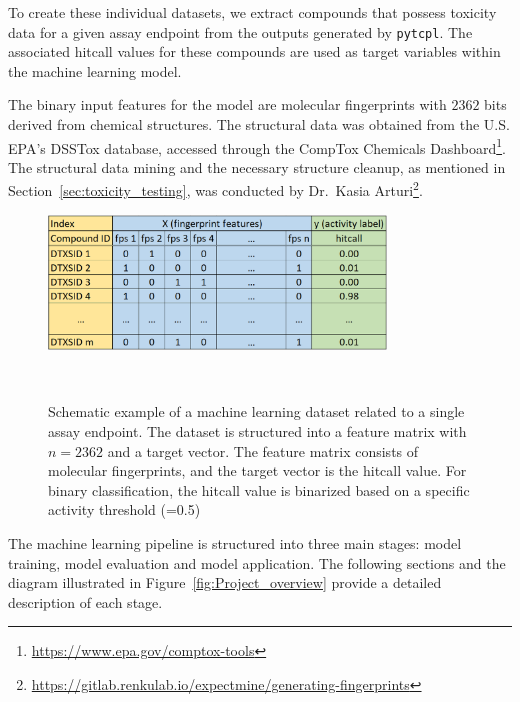 To create these individual datasets, we extract compounds that possess toxicity data for a given assay endpoint from the outputs generated by \texttt{pytcpl}. The associated hitcall values for these compounds are used as target variables within the machine learning model.

The binary input features for the model are molecular fingerprints with $2362$ bits derived from chemical structures. The structural data was obtained from the U.S. EPA's DSSTox database, accessed through the CompTox Chemicals Dashboard\footnote{\url{https://www.epa.gov/comptox-tools}}. The structural data mining and the necessary structure cleanup, as mentioned in Section~\ref{sec:toxicity_testing}, was conducted by Dr.\ Kasia Arturi\footnote{\url{https://gitlab.renkulab.io/expectmine/generating-fingerprints}}.

\begin{figure}[h]
    \centering
    \includegraphics[width=0.8\textwidth]{figures/ml_dataset.png}
    \caption{Schematic example of a machine learning dataset related to a single assay endpoint. The dataset is structured into a feature matrix with $n=2362$ and a target vector. The feature matrix consists of molecular fingerprints, and the target vector is the hitcall value. For binary classification, the hitcall value is binarized based on a specific activity threshold (=0.5)}
~\label{fig:ml_dataset}
\end{figure}


The machine learning pipeline is structured into three main stages: model training, model evaluation and model application. The following sections and the diagram illustrated in Figure~\ref{fig:Project_overview} provide a detailed description of each stage.

